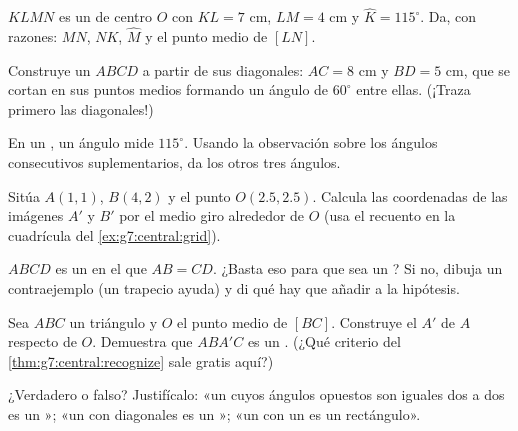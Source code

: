 \begin{exercise}[$\star$]\label{exo:g7:central:4}
$KLMN$ es un  de centro $O$ con $KL = 7$ cm,
$LM = 4$ cm y $\widehat K = 115^\circ$. Da, con razones: $MN$,
$NK$, $\widehat M$ y el punto medio de $[LN]$.
\end{exercise}

\begin{exercise}[$\star$]\label{exo:g7:central:5}
Construye un  $ABCD$ a partir de sus diagonales: $AC = 8$ cm y
$BD = 5$ cm, que se cortan en sus puntos medios formando un ángulo de $60^\circ$
entre ellas. (¡Traza primero las diagonales!)
\end{exercise}

\begin{exercise}[$\star$]\label{exo:g7:central:6}
En un , un ángulo mide $115^\circ$. Usando la observación
sobre los ángulos consecutivos suplementarios, da los otros tres ángulos.
\end{exercise}

\begin{exercise}[$\star\star$]\label{exo:g7:central:7}
Sitúa $A(1, 1)$, $B(4, 2)$ y el punto $O(2.5, 2.5)$. Calcula las
coordenadas de las imágenes $A'$ y $B'$ por el medio giro alrededor de $O$
(usa el recuento en la cuadrícula del \cref{ex:g7:central:grid}).
\end{exercise}

\begin{exercise}[$\star\star$]\label{exo:g7:central:8}
$ABCD$ es un  en el que $AB = CD$. ¿Basta eso para que sea
un ? Si no, dibuja un contraejemplo (un trapecio 
ayuda) y di qué hay que añadir a la hipótesis.
\end{exercise}

\begin{exercise}[$\star\star$]\label{exo:g7:central:9}
Sea $ABC$ un triángulo y $O$ el punto medio de $[BC]$. Construye el
 $A'$ de $A$ respecto de $O$. Demuestra que $ABA'C$ es un
. (¿Qué criterio del \cref{thm:g7:central:recognize} sale
gratis aquí?)
\end{exercise}

\begin{exercise}[$\star\star$]\label{exo:g7:central:10}
¿Verdadero o falso? Justifícalo: «un  cuyos ángulos opuestos
son iguales dos a dos es un »; «un  con
diagonales  es un »; «un  con un
 es un rectángulo».
\end{exercise}


